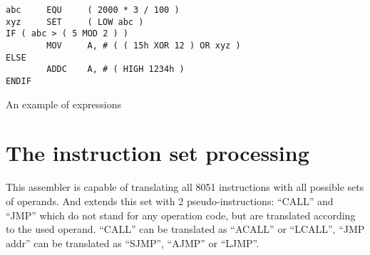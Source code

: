 \documentclass[a4paper,twoside,12pt]{book}
\newcommand{\mysmallfont}{\fontsize{8pt}{10pt} \selectfont{}}
\begin{document}
		\begin{code}[h!]
			\mysmallfont{}
			{\color{highlight_constant}\verb'abc'}\verb'     '{\color{highlight_directive}\verb'EQU'}\verb'     '{\color{highlight_symbol}\verb'('}\verb' '{\color{highlight_unknown_base}\verb'2000'}\verb' '{\color{highlight_symbol}\verb'*'}\verb' '{\color{highlight_unknown_base}\verb'3'}\verb' '{\color{highlight_symbol}\verb'/'}\verb' '{\color{highlight_unknown_base}\verb'100'}\verb' '{\color{highlight_symbol}\verb')'}\\
			{\color{highlight_constant}\verb'xyz'}\verb'     '{\color{highlight_directive}\verb'SET'}\verb'     '{\color{highlight_symbol}\verb'( LOW'}\verb' '{\color{highlight_constant}\verb'abc'}\verb' '{\color{highlight_symbol}\verb')'}\\
			{\color{highlight_directive}\verb'IF'}\verb' '{\color{highlight_symbol}\verb'('}\verb' '{\color{highlight_constant}\verb'abc'}\verb' '{\color{highlight_symbol}\verb'>'}\verb' '{\color{highlight_symbol}\verb'('}\verb' '{\color{highlight_unknown_base}\verb'5'}{\color{highlight_symbol}\verb' MOD'}\verb' '{\color{highlight_unknown_base}\verb'2'}\verb' '{\color{highlight_symbol}\verb')'}\verb' '{\color{highlight_symbol}\verb')'}\\
			\verb'        '{\color{highlight_instruction}\verb'MOV'}\verb'     '{\color{highlight_sfr}\verb'A'}{\color{highlight_oper_sep}\verb','}\verb' '{\color{highlight_symbol}\verb'#'}\verb' '{\color{highlight_symbol}\verb'('}\verb' '{\color{highlight_symbol}\verb'('}\verb' '{\color{highlight_hex}\verb'15h'}{\color{highlight_symbol}\verb' XOR'}\verb' '{\color{highlight_unknown_base}\verb'12'}\verb' '{\color{highlight_symbol}\verb') OR'}\verb' '{\color{highlight_constant}\verb'xyz'}\verb' '{\color{highlight_symbol}\verb')'}\\
			{\color{highlight_directive}\verb'ELSE'}\\
			\verb'        '{\color{highlight_instruction}\verb'ADDC'}\verb'    '{\color{highlight_sfr}\verb'A'}{\color{highlight_oper_sep}\verb','}\verb' '{\color{highlight_symbol}\verb'#'}\verb' '{\color{highlight_symbol}\verb'( HIGH'}\verb' '{\color{highlight_hex}\verb'1234h'}\verb' '{\color{highlight_symbol}\verb')'}\\
			{\color{highlight_directive}\verb'ENDIF'}

			\caption{An example of expressions}
		\end{code}

	\section{The instruction set processing}
		This assembler is capable of translating all 8051 instructions with all possible sets of operands. And extends this set with 2 pseudo-instructions: ``CALL'' and ``JMP'' which do not stand for any operation code, but are translated according to the used operand. ``CALL'' can be translated as ``ACALL'' or ``LCALL'', ``JMP addr'' can be translated as ``SJMP'', ``AJMP'' or ``LJMP''.
\end{document}
